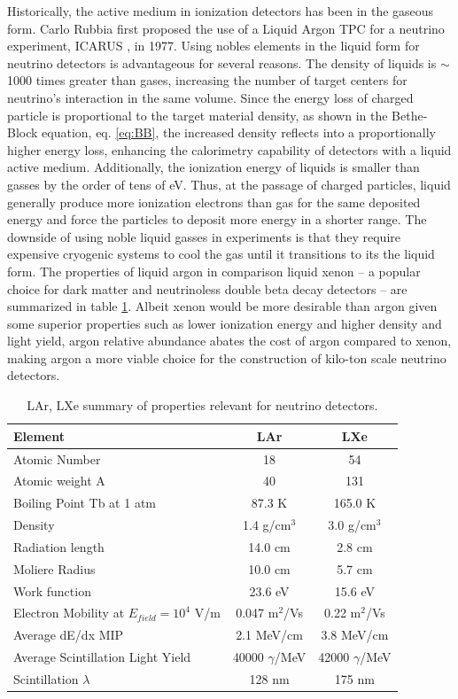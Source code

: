 Historically, the active medium in ionization detectors has been in the gaseous form. Carlo Rubbia first proposed the use of a Liquid Argon TPC for a neutrino experiment, ICARUS \cite{Rubbia:1977zz}, in 1977.  Using nobles elements in the liquid form for neutrino detectors is advantageous for several reasons.  The density of liquids is $\sim$1000 times greater than gases, increasing the number of target centers for neutrino's interaction in the same volume. Since the energy loss of charged particle is proportional to the target material density, as shown in the Bethe-Block equation, eq. \ref{eq:BB}, the increased density reflects into a proportionally higher energy loss, enhancing the calorimetry capability of detectors with a liquid active medium. Additionally, the ionization energy of liquids is smaller than gasses by the order of tens of eV. Thus, at the passage of charged particles, liquid generally produce more ionization electrons than gas for the same deposited energy and force the particles to deposit more energy in a shorter range. The downside of using noble liquid gasses in experiments is that they require expensive cryogenic systems to cool the gas until it transitions to its the liquid form.
The properties of liquid argon in comparison liquid xenon -- a popular choice for dark matter and neutrinoless double beta decay detectors -- are summarized in table \ref{tab:properties}.  Albeit xenon would be more desirable than argon given some superior properties such as lower ionization energy and higher density and light yield, argon relative abundance abates the cost of argon compared to xenon, making argon a more viable choice for the construction of kilo-ton scale neutrino detectors. 




\begin{table}[]
\centering
\begin{tabular}{|l|c|c|}\hline
Element & LAr & LXe \\
\hline
\hline
Atomic Number &  18 &54 \\
Atomic weight A & 40  & 131\\
Boiling Point Tb at 1 atm & 87.3 K & 165.0 K\\
Density  & 1.4 g/cm$^3$& 3.0 g/cm$^3$\\
Radiation length  & 14.0 cm& 2.8 cm \\
Moliere Radius  &10.0 cm& 5.7 cm\\
Work function  & 23.6 eV&15.6 eV\\
Electron Mobility at $E_{field} =10^4$ V/m &0.047 m$^2$/Vs& 0.22 m$^2$/Vs\\
Average dE/dx MIP  & 2.1 MeV/cm&3.8 MeV/cm\\
Average Scintillation Light Yield & 40000 $\gamma$/MeV&42000 $\gamma$/MeV\\
Scintillation $\lambda$  &128 nm&175 nm\\
\hline
\end{tabular}
\caption{LAr, LXe summary of properties relevant for neutrino detectors.}
\label{tab:properties}
\end{table}


